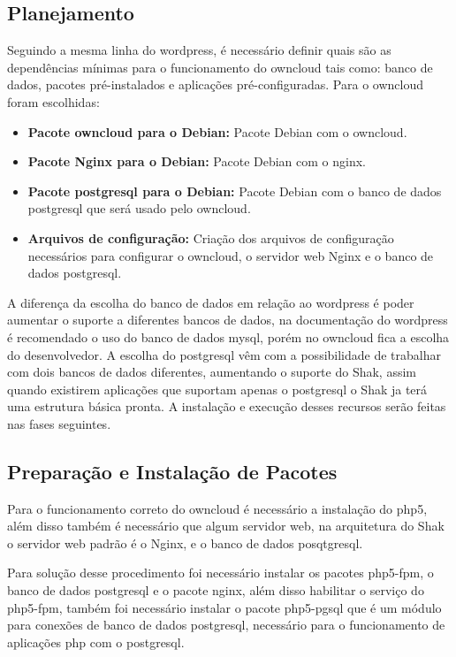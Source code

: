 \subsection{Planejamento}

Seguindo a mesma linha do wordpress, é necessário definir quais são as dependências
mínimas para o funcionamento do owncloud tais como: banco de dados, pacotes
pré-instalados e aplicações pré-configuradas. Para o owncloud foram escolhidas:

\begin{itemize}
   \item \textbf{Pacote owncloud para o Debian:} Pacote Debian com o owncloud.
   \item \textbf{Pacote Nginx para o Debian:} Pacote Debian com o nginx.
   \item \textbf{Pacote postgresql para o Debian:} Pacote Debian com o banco de dados postgresql
   que será usado pelo owncloud.
   \item \textbf{Arquivos de configuração:} Criação dos arquivos de configuração
   necessários para configurar o owncloud, o servidor web Nginx e o banco de dados
   postgresql.
\end{itemize}

A diferença da escolha do banco de dados em relação ao wordpress é poder aumentar
o suporte a diferentes bancos de dados, na documentação do wordpress é recomendado
o uso do banco de dados mysql, porém no owncloud fica a escolha do desenvolvedor.
A escolha do postgresql vêm com a possibilidade de trabalhar com dois bancos de
dados diferentes, aumentando o suporte do Shak, assim quando existirem aplicações
que suportam apenas o postgresql o Shak ja terá uma estrutura básica pronta.
A instalação e execução desses recursos serão feitas nas fases seguintes.

\subsection{Preparação e Instalação de Pacotes}

Para o funcionamento correto do owncloud é necessário a instalação do php5, além
disso também é necessário que algum servidor web, na arquitetura do Shak o servidor
web padrão é o Nginx, e o banco de dados posqtgresql.

Para solução desse procedimento foi necessário instalar os pacotes php5-fpm, o banco
de dados postgresql e o pacote nginx, além disso habilitar o serviço do php5-fpm,
também foi necessário instalar o pacote php5-pgsql que é um módulo para
conexões de banco de dados postgresql, necessário para o funcionamento de
aplicações php com o postgresql.

